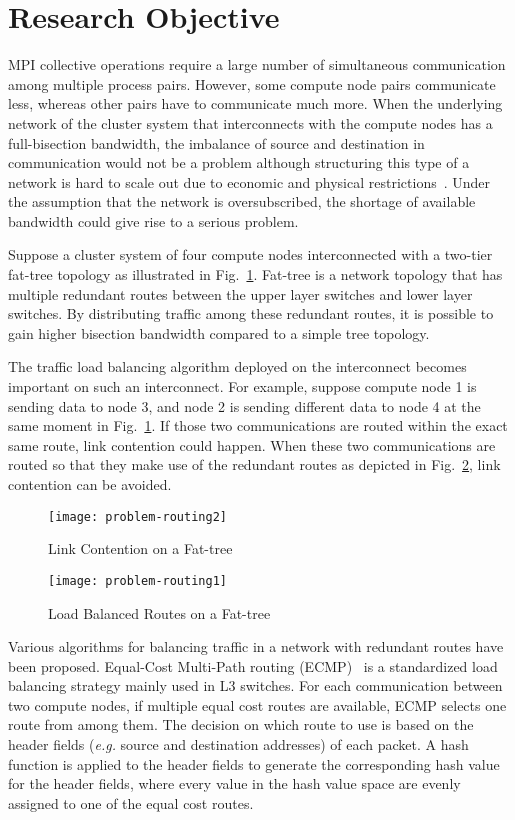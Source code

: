 \section{Research Objective}\label{sec:iii-background}

MPI collective operations require a large number of simultaneous communication
among multiple process pairs. However, some compute node pairs communicate
less, whereas other pairs have to communicate much more. When the underlying
network of the cluster system that interconnects with the compute nodes has a
full-bisection bandwidth, the imbalance of source and destination in
communication would not be a problem although structuring this type of a
network is hard to scale out due to economic and physical
restrictions~\autocite{Al-Fares2008}. Under the assumption that the network is
oversubscribed, the shortage of available bandwidth could give rise to a
serious problem.

Suppose a cluster system of four compute nodes interconnected with a
two-tier fat-tree topology as illustrated in Fig.~\ref{fig:problem-routing1}.
Fat-tree is a network topology that has multiple redundant routes between the
upper layer switches and lower layer switches. By distributing traffic among
these redundant routes, it is possible to gain higher bisection bandwidth
compared to a simple tree topology.

The traffic load balancing algorithm deployed on the interconnect becomes
important on such an interconnect. For example, suppose compute node 1 is
sending data to node 3, and node 2 is sending different data to node 4 at the
same moment in Fig.~\ref{fig:problem-routing1}. If those two communications
are routed within the exact same route, link contention could happen. When
these two communications are routed so that they make use of the redundant
routes as depicted in Fig.~\ref{fig:problem-routing2}, link contention can be
avoided.

\begin{figure}
    \centering
    \texttt{[image: problem-routing2]}
    \caption{Link Contention on a Fat-tree}%
    \label{fig:problem-routing1}
\end{figure}

\begin{figure}
    \centering
    \texttt{[image: problem-routing1]}
    \caption{Load Balanced Routes on a Fat-tree}%
    \label{fig:problem-routing2}
\end{figure}

Various algorithms for balancing traffic in a network with redundant routes
have been proposed. Equal-Cost Multi-Path routing (ECMP)~\autocite{ecmp} is a
standardized load balancing strategy mainly used in L3 switches. For each
communication between two compute nodes, if multiple equal cost routes are
available, ECMP selects one route from among them. The decision on which route
to use is based on the header fields (\emph{e.g.} source and destination
addresses) of each packet. A hash function is applied to the header fields to
generate the corresponding hash value for the header fields, where every value
in the hash value space are evenly assigned to one of the equal cost routes.

